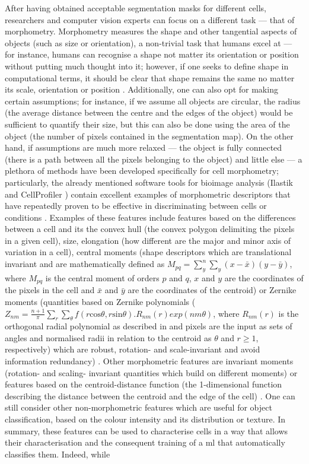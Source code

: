 After having obtained acceptable segmentation masks for different cells, researchers and computer vision experts can focus on a different task --- that of morphometry. Morphometry measures the shape and other tangential aspects of objects (such as size or orientation), a non-trivial task that humans excel at --- for instance, humans can recognise a shape not matter its orientation or position without putting much thought into it; however, if one seeks to define shape in computational terms, it should be clear that shape remains the same no matter its scale, orientation or position \cite{Kendall1977-yx}. Additionally, one can also opt for making certain assumptions; for instance, if we assume all objects are circular, the radius (the average distance between the centre and the edges of the object) would be sufficient to quantify their size, but this can also be done using the area of the object (the number of pixels contained in the segmentation map). On the other hand, if assumptions are much more relaxed --- the object is fully connected (there is a path between all the pixels belonging to the object) and little else --- a plethora of methods have been developed specifically for cell morphometry; particularly, the already mentioned software tools for bioimage analysis (Ilastik \cite{Sommer2011-ds} and CellProfiler \cite{Carpenter2006-hy}) contain excellent examples of morphometric descriptors that have repeatedly proven to be effective in discriminating between cells or conditions \cite{Fuchs2010-pk,Gustafsdottir2013-ul, Simm2018-nh}. Examples of these features include features based on the differences between a cell and its the convex hull (the convex polygon delimiting the pixels in a given cell), size, elongation (how different are the major and minor axis of variation in a cell), central moments (shape descriptors which are translational invariant and are mathematically defined as $M_{pq} = \sum_y^n\sum_y(x-\bar{x})(y-\bar{y})$, where $M_{pq}$ is the central moment of orders $p$ and $q$, $x$ and $y$ are the coordinates of the pixels in the cell and $\bar{x}$ and $\bar{y}$ are the coordinates of the centroid) or Zernike moments (quantities based on Zernike polynomials ($Z_{nm} = \frac{n+1}{\pi}\sum_r\sum_{\theta}f(r\mathrm{cos}\theta,r\mathrm{sin}\theta).R_{nm}(r)exp(nm\theta)$, where $R_{nm}(r)$ is the orthogonal radial polynomial as described in \cite{Mingqiang2008-wv} and pixels are the input as sets of angles and normalised radii in relation to the centroid as $\theta$ and $r \ge 1$, respectively) which are robust, rotation- and scale-invariant and avoid information redundancy) \cite{Sommer2011-ds,Carpenter2006-hy}. Other morphometric features are invariant moments (rotation- and scaling- invariant quantities which build on different moments) or features based on the centroid-distance function (the 1-dimensional function describing the distance between the centroid and the edge of the cell) \cite{Mingqiang2008-wv}. One can still consider other non-morphometric features which are useful for object classification, based on the colour intensity and its distribution or texture. In summary, these features can be used to characterise cells in a way that allows their characterisation and the consequent training of a \ac{ml} that automatically classifies them. Indeed, while 